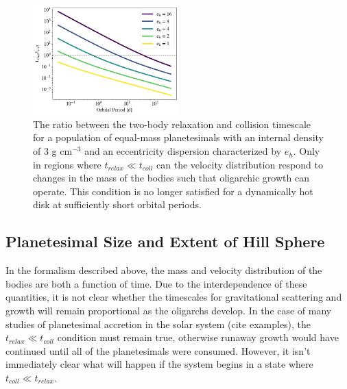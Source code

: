 \documentclass[twocolumn]{aastex63}
\begin{document}
\begin{figure}
\begin{center}
    \includegraphics[width=0.5\textwidth]{figures/timescales.png}
    \caption{The ratio between the two-body relaxation and collision
      timescale for a population of equal-mass planetesimals with an
      internal density of 3 g cm$^{-3}$ and an eccentricity dispersion
      characterized by $e_h$. Only in regions where $t_{relax} \ll t_{coll}$ can 
      the velocity distribution respond to changes in the mass of the bodies such
      that oligarchic growth can operate. This condition is no longer satisfied for a dynamically hot disk at sufficiently short orbital periods.\label{fig:timescales}}
\end{center}
\end{figure}

\subsection{Planetesimal Size and Extent of Hill Sphere}\label{sec:sizeandhill}

In the formalism described above, the mass and velocity distribution of the bodies are both a function of time. Due to the interdependence of these quantities, it is not clear whether the timescales for gravitational scattering and growth will remain proportional as the oligarchs develop. In the case of many studies of planetesimal accretion in the solar system (cite examples), the $t_{relax} \ll t_{coll}$ condition must remain true, otherwise runaway growth would have continued until all of the planetesimals were consumed. However, it isn't immediately clear what will happen if the system begins in a state where $t_{coll} \ll t_{relax}$.
\end{document}
